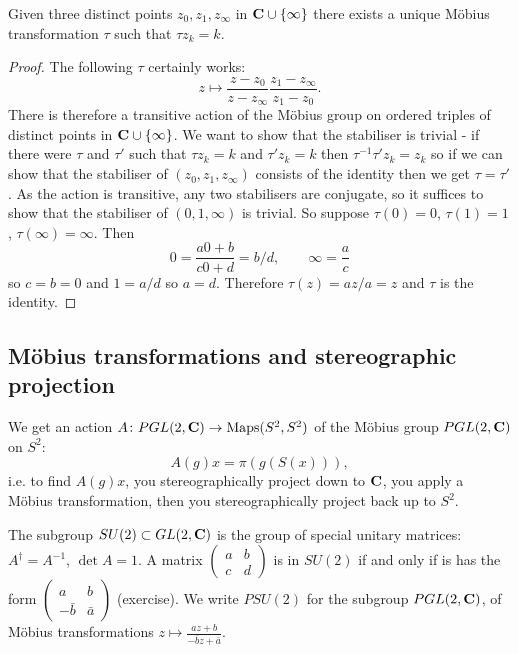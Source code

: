 \documentclass[12pt]{article}
\begin{document}
  \begin{thm}
    Given three distinct points $z_0,z_1,z_\infty$ in $\mathbf{C}\cup\{\infty\}$ there exists a unique M\"obius transformation $\tau$ such that $\tau z_k=k$.
  \end{thm}
  \begin{proof}
    The following $\tau$ certainly works:
    \[z\mapsto\frac{z-z_0}{z-z_\infty}\frac{z_1-z_\infty}{z_1-z_0}.\]
    There is therefore a transitive action of the M\"obius group on ordered triples of distinct points in $\mathbf{C}\cup\{\infty\}$. We want to show that the stabiliser is trivial - if there were $\tau$ and $\tau'$ such that $\tau z_k=k$ and $\tau' z_k=k$ then $\tau^{-1}\tau' z_k=z_k$ so if we can show that the stabiliser of $(z_0,z_1,z_\infty)$ consists of the identity then we get $\tau=\tau'$. As the action is transitive, any two stabilisers are conjugate, so it suffices to show that the stabiliser of $(0,1,\infty)$ is trivial. So suppose $\tau(0)=0$, $\tau(1)=1$, $\tau(\infty)=\infty$. Then
    \[0=\frac{a0+b}{c0+d}=b/d,\qquad\infty=\frac{a}{c}\]
    so $c=b=0$ and $1=a/d$ so $a=d$. Therefore $\tau(z)=az/a=z$ and $\tau$ is the identity.
  \end{proof}
  
  \subsection{M\"obius transformations and stereographic projection}

  \begin{dfn}
    We get an action $A\colon PGL(2,\mathbf{C})\to\operatorname{Maps}(S^2,S^2)$ of the M\"obius group $PGL(2,\mathbf{C})$ on $S^2$:
    \[A(g)x=\pi(g(S(x))),\]
    i.e. to find $A(g)x$, you stereographically project down to $\mathbf{C}$, you apply a M\"obius transformation, then you stereographically project back up to $S^2$.
  \end{dfn}

  \begin{dfn}
    The subgroup $SU(2)\subset GL(2,\mathbf{C})$ is the group of special unitary matrices: $A^\dagger=A^{-1}$, $\det A=1$. A matrix $\left(\begin{array}{cc}a&b\\c&d\end{array}\right)$ is in $SU(2)$ if and only if is has the form $\left(\begin{array}{cc}a&b\\-\bar{b}&\bar{a}\end{array}\right)$ (exercise). We write $PSU(2)$ for the subgroup $PGL(2,\mathbf{C})$, of M\"obius transformations $z\mapsto \frac{az+b}{-\bar{b}z+\bar{a}}$.
  \end{dfn}
  
\end{document}
